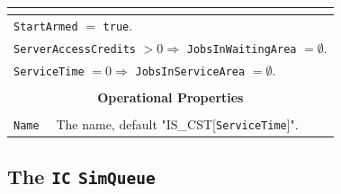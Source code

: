 \documentclass[12pt]{book}
\begin{document}
\begin{tabular}{|l|l|l|l|}
\multicolumn{4}{|c|}{} \\
\hline
\multicolumn{4}{|l|}{\lstinline|StartArmed| $=$ \lstinline|true|.} \\
\multicolumn{4}{|l|}{\lstinline|ServerAccessCredits| $> 0 \Rightarrow$ \lstinline|JobsInWaitingArea| $= \emptyset$.} \\
\multicolumn{4}{|l|}{\lstinline|ServiceTime| $= 0 \Rightarrow$ \lstinline|JobsInServiceArea| $= \emptyset$.} \\
\hline
\multicolumn{4}{|c|}{} \\
\multicolumn{4}{|c|}{\bf Operational Properties} \\
\multicolumn{4}{|c|}{} \\
\hline
\lstinline|Name| & \multicolumn{3}{|l|}{The name, default "IS\_CST[\lstinline|ServiceTime|]".} \\
\hline
\end{tabular}

\subsection{The \lstinline{IC} \lstinline{SimQueue}}
\label{sec:IC}
\end{document}
